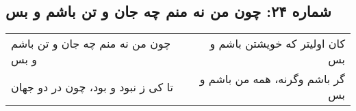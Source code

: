 \begin{center}
\section*{شماره ۲۴: چون من نه منم چه جان و تن باشم و بس}
\label{sec:024}
\begin{longtable}{l p{0.5cm} r}
چون من نه منم چه جان و تن باشم و بس
&&
کان اولیتر که خویشتن باشم و بس
\\
تا کی ز نبود و بود، چون در دو جهان
&&
گر باشم وگرنه، همه من باشم و بس
\\
\end{longtable}
\end{center}
